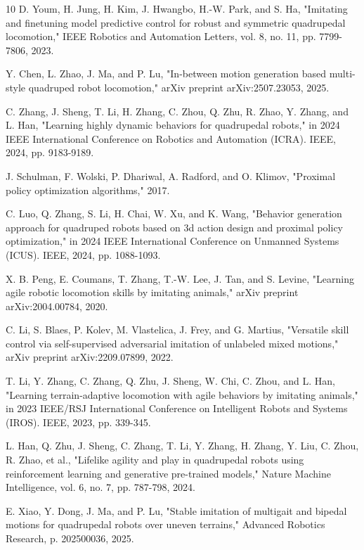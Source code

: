 \documentclass[letterpaper, 10pt, conference]{IEEEtran}
\begin{document}
\begin{thebibliography}{10}
 D. Youm, H. Jung, H. Kim, J. Hwangbo, H.-W. Park, and S. Ha, "Imitating and finetuning model predictive control for robust and symmetric quadrupedal locomotion," IEEE Robotics and Automation Letters, vol. 8, no. 11, pp. 7799-7806, 2023.

 Y. Chen, L. Zhao, J. Ma, and P. Lu, "In-between motion generation based multi-style quadruped robot locomotion," arXiv preprint arXiv:2507.23053, 2025.

 C. Zhang, J. Sheng, T. Li, H. Zhang, C. Zhou, Q. Zhu, R. Zhao, Y. Zhang, and L. Han, "Learning highly dynamic behaviors for quadrupedal robots," in 2024 IEEE International Conference on Robotics and Automation (ICRA). IEEE, 2024, pp. 9183-9189.

 J. Schulman, F. Wolski, P. Dhariwal, A. Radford, and O. Klimov, "Proximal policy optimization algorithms," 2017.

 C. Luo, Q. Zhang, S. Li, H. Chai, W. Xu, and K. Wang, "Behavior generation approach for quadruped robots based on 3d action design and proximal policy optimization," in 2024 IEEE International Conference on Unmanned Systems (ICUS). IEEE, 2024, pp. 1088-1093.

 X. B. Peng, E. Coumans, T. Zhang, T.-W. Lee, J. Tan, and S. Levine, "Learning agile robotic locomotion skills by imitating animals," arXiv preprint arXiv:2004.00784, 2020.

 C. Li, S. Blaes, P. Kolev, M. Vlastelica, J. Frey, and G. Martius, "Versatile skill control via self-supervised adversarial imitation of unlabeled mixed motions," arXiv preprint arXiv:2209.07899, 2022.

 T. Li, Y. Zhang, C. Zhang, Q. Zhu, J. Sheng, W. Chi, C. Zhou, and L. Han, "Learning terrain-adaptive locomotion with agile behaviors by imitating animals," in 2023 IEEE/RSJ International Conference on Intelligent Robots and Systems (IROS). IEEE, 2023, pp. 339-345.

 L. Han, Q. Zhu, J. Sheng, C. Zhang, T. Li, Y. Zhang, H. Zhang, Y. Liu, C. Zhou, R. Zhao, et al., "Lifelike agility and play in quadrupedal robots using reinforcement learning and generative pre-trained models," Nature Machine Intelligence, vol. 6, no. 7, pp. 787-798, 2024.

 E. Xiao, Y. Dong, J. Ma, and P. Lu, "Stable imitation of multigait and bipedal motions for quadrupedal robots over uneven terrains," Advanced Robotics Research, p. 202500036, 2025.


\end{thebibliography}
\end{document}
